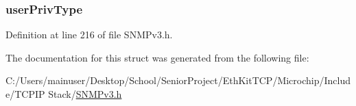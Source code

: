 \subsubsection[{user\+Priv\+Type}]{ user\+Priv\+Type}\label{structsnmp_v3_engn_user_data_base_a7494f0bbde28857f7065875edbe3d612}


Definition at line 216 of file S\+N\+M\+Pv3.\+h.



The documentation for this struct was generated from the following file\+:\begin{DoxyCompactItemize}
\item 
C\+:/\+Users/mainuser/\+Desktop/\+School/\+Senior\+Project/\+Eth\+Kit\+T\+C\+P/\+Microchip/\+Include/\+T\+C\+P\+I\+P Stack/\hyperlink{_s_n_m_pv3_8h}{S\+N\+M\+Pv3.\+h}\end{DoxyCompactItemize}
